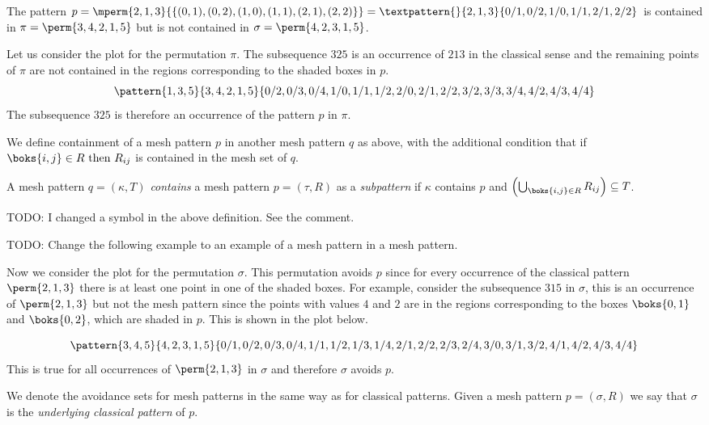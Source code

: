 \begin{example}
    The pattern \(p=\mperm{2,1,3}{\{(0,1),(0,2),(1,0),(1,1),(2,1),(2,2)\}}=
    \textpattern{}{ 2, 1, 3 }{ 0/1, 0/2, 1/0, 1/1, 2/1, 2/2 }\) is contained in
    \(\pi = \perm{3,4,2,1,5}\) but is not contained in \(\sigma = \perm{4,2,3,1,5}\).
\end{example}

Let us consider the plot for the permutation \(\pi\). The subsequence \(325\) is
an occurrence of \(213\) in the classical sense and the remaining points of \(\pi\)
are not contained in the regions corresponding to the shaded boxes in \(p\).
\begin{equation*}
    \pattern{1,3,5}{3,4,2,1,5}{0/2,0/3,0/4,
                               1/0,1/1,1/2,
                               2/0,2/1,2/2,
                               3/2,3/3,3/4,
                               4/2,4/3,4/4}
\end{equation*}
The subsequence \(325\) is therefore an occurrence of the pattern \(p\) in \(\pi\).

We define containment of a mesh pattern \(p\) in another mesh pattern \(q\) as above,
with the additional condition that if \(\boks{i,j}\in R\text{ then } R_{ij}\) is
contained in the mesh set of \(q\).

\begin{definition}
A mesh pattern \(q=(\kappa,T)\) \emph{contains} a mesh pattern \(p=(\tau,R)\) as a \emph{subpattern}
if \(\kappa\) contains \(p\) and \(\left(\bigcup_{\boks{i,j}\in R} R_{ij}\right)\subseteq T\).
\end{definition}

TODO: I changed a symbol in the above definition. See the comment.

TODO: Change the following example to an example of a mesh pattern in a mesh
pattern.

Now we consider the plot for the permutation \(\sigma\). This permutation
avoids \(p\) since for every occurrence of the classical pattern \(\perm{2,1,3}\)
there is at least one point in one of the shaded boxes. For example, consider the
subsequence \(315\) in \(\sigma\), this is an occurrence of \(\perm{2,1,3}\) but
not the mesh pattern since the points with values \(4\) and \(2\) are in the
regions corresponding to the boxes \(\boks{0,1}\) and \(\boks{0,2}\), which are shaded in
\(p\). This is shown in the plot below.

\begin{equation*}
    \pattern{3,4,5}{4,2,3,1,5}{0/1,0/2,0/3,0/4,
                               1/1,1/2,1/3,1/4,
                               2/1,2/2,2/3,2/4,
                               3/0,3/1,3/2,
                               4/1,4/2,4/3,4/4}
\end{equation*}
This is true for all occurrences of \(\perm{2,1,3}\) in \(\sigma\) and
therefore \(\sigma\) avoids \(p\).

We denote the avoidance sets for mesh patterns in the same way as for
classical patterns. Given a mesh pattern \(p=(\sigma,R)\) we say that \(\sigma\) is the \emph{underlying
classical pattern} of \(p\).
